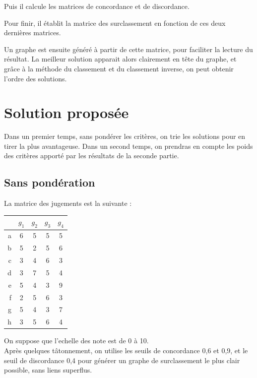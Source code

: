 
Puis il calcule les matrices de concordance et de discordance.



Pour finir, il établit la matrice des surclassement en fonction de ces deux dernières matrices.


Un graphe est ensuite généré à partir de cette matrice, pour faciliter la lecture du résultat.
La meilleur solution apparait alors clairement en tête du graphe, et grâce à la méthode du classement et du classement inverse, on peut obtenir l'ordre des solutions.

\section{Solution proposée}

Dans un premier temps, sans pondérer les critères, on trie les solutions pour en tirer la plus avantageuse. Dans un second temps, on prendras en compte les poids des critères apporté par les résultats de la seconde partie.

\subsection{Sans pondération}

La matrice des jugements est la suivante :\\
\begin{center}
\begin{tabular}{r | c c c c}
~ & $g_1$ & $g_2$ & $g_3$ & $g_4$ \\ \hline
a & 6 & 5 & 5 & 5 \\
b & 5 & 2 & 5 & 6 \\
c & 3 & 4 & 6 & 3 \\
d & 3 & 7 & 5 & 4 \\
e & 5 & 4 & 3 & 9 \\
f & 2 & 5 & 6 & 3 \\
g & 5 & 4 & 3 & 7 \\
h & 3 & 5 & 6 & 4 \\
\end{tabular}
\end{center}
On suppose que l'echelle des note est de 0 à 10.\\

Après quelques tâtonnement, on utilise les seuils de concordance 0,6 et 0,9, et le seuil de discordance 0,4 pour générer un graphe de surclassement le plus clair possible, sans liens superflus.

